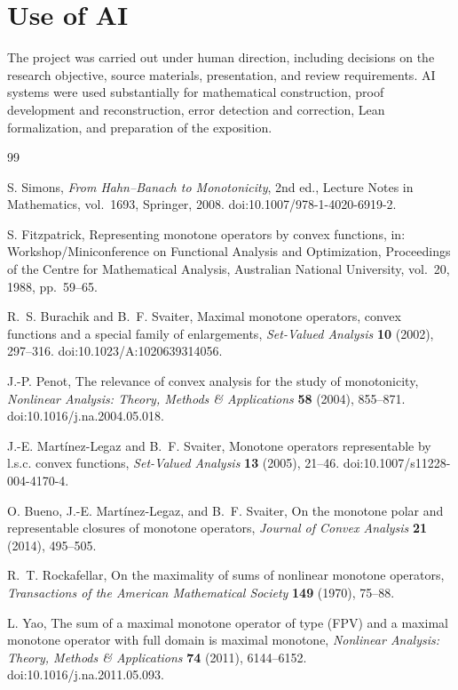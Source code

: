 \section*{Use of AI}
The project was carried out under human direction, including decisions on
the research objective, source materials, presentation, and review requirements.
AI systems were used substantially for mathematical construction, proof
development and reconstruction, error detection and correction, Lean
formalization, and preparation of the exposition.

\begin{thebibliography}{99}
\raggedright
{}
S. Simons,
\emph{From Hahn--Banach to Monotonicity}, 2nd ed.,
Lecture Notes in Mathematics, vol.~1693, Springer, 2008.
doi:10.1007/978-1-4020-6919-2.

S. Fitzpatrick,
Representing monotone operators by convex functions,
in: Workshop/Miniconference on Functional Analysis and Optimization,
Proceedings of the Centre for Mathematical Analysis, Australian National
University, vol.~20, 1988, pp.~59--65.

R.~S. Burachik and B.~F. Svaiter,
Maximal monotone operators, convex functions and a special family of enlargements,
\emph{Set-Valued Analysis} \textbf{10} (2002), 297--316.
doi:10.1023/A:1020639314056.

J.-P. Penot,
The relevance of convex analysis for the study of monotonicity,
\emph{Nonlinear Analysis: Theory, Methods \& Applications}
\textbf{58} (2004), 855--871.
doi:10.1016/j.na.2004.05.018.

J.-E. Mart\'{i}nez-Legaz and B.~F. Svaiter,
Monotone operators representable by l.s.c. convex functions,
\emph{Set-Valued Analysis} \textbf{13} (2005), 21--46.
doi:10.1007/s11228-004-4170-4.

O. Bueno, J.-E. Mart\'{i}nez-Legaz, and B.~F. Svaiter,
On the monotone polar and representable closures of monotone operators,
\emph{Journal of Convex Analysis} \textbf{21} (2014), 495--505.

R.~T. Rockafellar,
On the maximality of sums of nonlinear monotone operators,
\emph{Transactions of the American Mathematical Society}
\textbf{149} (1970), 75--88.

L. Yao,
The sum of a maximal monotone operator of type (FPV) and a maximal
monotone operator with full domain is maximal monotone,
\emph{Nonlinear Analysis: Theory, Methods \& Applications}
\textbf{74} (2011), 6144--6152.
doi:10.1016/j.na.2011.05.093.


\end{thebibliography}
